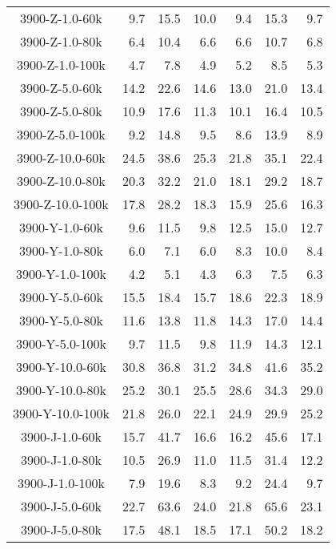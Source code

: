 \begin{longtable}{crrrrrr}
      3900-Z-1.0-60k   &   9.7 &  15.5 &  10.0 &   9.4 &  15.3 &   9.7 \\
      3900-Z-1.0-80k   &   6.4 &  10.4 &   6.6 &   6.6 &  10.7 &   6.8 \\
      3900-Z-1.0-100k  &   4.7 &   7.8 &   4.9 &   5.2 &   8.5 &   5.3 \\
      3900-Z-5.0-60k   &  14.2 &  22.6 &  14.6 &  13.0 &  21.0 &  13.4 \\
      3900-Z-5.0-80k   &  10.9 &  17.6 &  11.3 &  10.1 &  16.4 &  10.5 \\
      3900-Z-5.0-100k  &   9.2 &  14.8 &   9.5 &   8.6 &  13.9 &   8.9 \\
      3900-Z-10.0-60k  &  24.5 &  38.6 &  25.3 &  21.8 &  35.1 &  22.4 \\
      3900-Z-10.0-80k  &  20.3 &  32.2 &  21.0 &  18.1 &  29.2 &  18.7 \\
      3900-Z-10.0-100k &  17.8 &  28.2 &  18.3 &  15.9 &  25.6 &  16.3 \\
      3900-Y-1.0-60k   &   9.6 &  11.5 &   9.8 &  12.5 &  15.0 &  12.7 \\
      3900-Y-1.0-80k   &   6.0 &   7.1 &   6.0 &   8.3 &  10.0 &   8.4 \\
      3900-Y-1.0-100k  &   4.2 &   5.1 &   4.3 &   6.3 &   7.5 &   6.3 \\
      3900-Y-5.0-60k   &  15.5 &  18.4 &  15.7 &  18.6 &  22.3 &  18.9 \\
      3900-Y-5.0-80k   &  11.6 &  13.8 &  11.8 &  14.3 &  17.0 &  14.4 \\
      3900-Y-5.0-100k  &   9.7 &  11.5 &   9.8 &  11.9 &  14.3 &  12.1 \\
      3900-Y-10.0-60k  &  30.8 &  36.8 &  31.2 &  34.8 &  41.6 &  35.2 \\
      3900-Y-10.0-80k  &  25.2 &  30.1 &  25.5 &  28.6 &  34.3 &  29.0 \\
      3900-Y-10.0-100k &  21.8 &  26.0 &  22.1 &  24.9 &  29.9 &  25.2 \\
      3900-J-1.0-60k   &  15.7 &  41.7 &  16.6 &  16.2 &  45.6 &  17.1 \\
      3900-J-1.0-80k   &  10.5 &  26.9 &  11.0 &  11.5 &  31.4 &  12.2 \\
      3900-J-1.0-100k  &   7.9 &  19.6 &   8.3 &   9.2 &  24.4 &   9.7 \\
      3900-J-5.0-60k   &  22.7 &  63.6 &  24.0 &  21.8 &  65.6 &  23.1 \\
      3900-J-5.0-80k   &  17.5 &  48.1 &  18.5 &  17.1 &  50.2 &  18.2 \\

\end{longtable}
